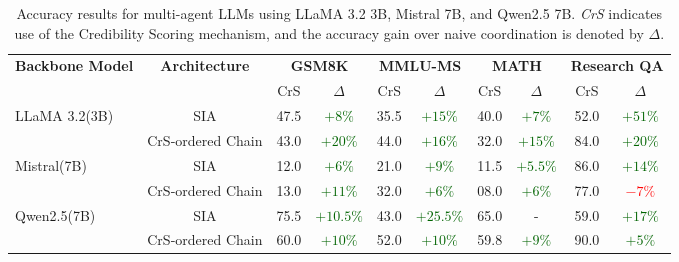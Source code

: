 \begin{table}[ht]
\centering
\small
\caption{Accuracy results for multi-agent LLMs using LLaMA 3.2 3B, Mistral 7B, and Qwen2.5 7B. \textit{CrS} indicates use of the Credibility Scoring mechanism, and the accuracy gain over naive coordination is denoted by $\Delta$.}
\begin{tabular}{|l|c|cc|cc|cc|cc|}
\toprule
\textbf{Backbone Model} & \textbf{Architecture} & \multicolumn{2}{c|}{\textbf{GSM8K}} & \multicolumn{2}{c|}{\textbf{MMLU-MS}} & \multicolumn{2}{c|}{\textbf{MATH}} & \multicolumn{2}{c|}{\textbf{Research QA}} \\
\cmidrule(r){3-4} \cmidrule(r){5-6} \cmidrule(r){7-8} \cmidrule(r){9-10}
&& CrS & $\Delta$ & CrS  & $\Delta$ & CrS & $\Delta$ & CrS & $\Delta$ \\
\midrule
\multirow{2}{*}{LLaMA 3.2(3B)} 
& SIA & 47.5 & \textcolor{darkgreen}{$+8\%$} & 35.5 & \textcolor{darkgreen}{$+15\%$} & 40.0 & \textcolor{darkgreen}{$+7\%$} & 52.0 & \textcolor{darkgreen}{$+51\%$} \\
& CrS‑ordered Chain & 43.0  & \textcolor{darkgreen}{$+20\%$} & 44.0 & \textcolor{darkgreen}{$+16\%$} & 32.0 & \textcolor{darkgreen}{$+15\%$} & 84.0 & \textcolor{darkgreen}{$+20\%$} \\
\midrule
\multirow{2}{*}{Mistral(7B)} 
&SIA& 12.0 & \textcolor{darkgreen}{$+6\%$} & 21.0 & \textcolor{darkgreen}{$+9\%$} & 11.5 & \textcolor{darkgreen}{$+5.5\%$} & 86.0 & \textcolor{darkgreen}{$+14\%$} \\
& CrS‑ordered Chain& 13.0 & \textcolor{darkgreen}{$+11\%$} & 32.0 & \textcolor{darkgreen}{$+6\%$} & 08.0 & \textcolor{darkgreen}{$+6\%$} & 77.0 & \textcolor{red}{$-7\%$} \\
\midrule
\multirow{2}{*}{Qwen2.5(7B)} 
& SIA& 75.5 & \textcolor{darkgreen}{$+10.5\%$} & 43.0 & \textcolor{darkgreen}{$+25.5\%$} & 65.0 & - & 59.0 & \textcolor{darkgreen}{$+17\%$} \\
& CrS‑ordered Chain& 60.0 & \textcolor{darkgreen}{$+10\%$} & 52.0 & \textcolor{darkgreen}{$+10\%$} & 59.8 & \textcolor{darkgreen}{$+9\%$} & 90.0 & \textcolor{darkgreen}{$+5\%$} \\
\bottomrule
\end{tabular}
\label{tab:progress-results}
\end{table}



